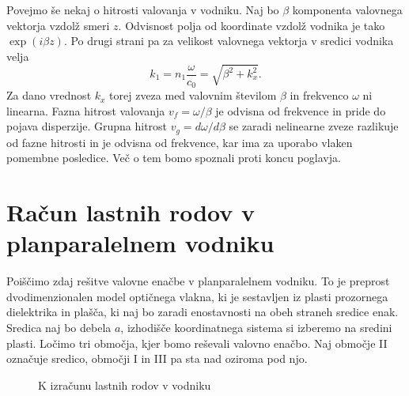 Povejmo še nekaj o hitrosti valovanja v vodniku.
Naj bo $\beta$ komponenta valovnega vektorja vzdolž smeri $z$. Odvisnost polja
od koordinate vzdolž vodnika je tako $\exp (i\beta z)$. Po drugi strani pa za velikost
valovnega vektorja v sredici vodnika velja
\begin{equation}
k_1 = n_{1}\frac{\omega}{c_0}=\sqrt{\beta^{2}+k_{x}^{2}}
\label{9.0}.
\end{equation}
Za dano vrednost $k_{x}$ torej zveza med valovnim številom $\beta$
in frekvenco $\omega$ ni linearna. Fazna hitrost valovanja $v_{f}=\omega/\beta$ je
odvisna od frekvence in pride do pojava disperzije. Grupna hitrost $v_{g}=d\omega/d\beta$ 
se zaradi nelinearne zveze razlikuje od fazne hitrosti in je odvisna od 
frekvence, kar ima za uporabo vlaken pomembne posledice. Več o tem bomo spoznali 
proti koncu poglavja. 

\section{Račun lastnih rodov v planparalelnem vodniku}
Poiščimo zdaj rešitve valovne enačbe v planparalelnem vodniku. 
To je preprost dvodimenzionalen model optičnega vlakna, ki je sestavljen iz 
plasti prozornega dielektrika in plašča, ki naj bo zaradi enostavnosti na obeh 
straneh sredice enak. Sredica naj bo debela $a$, izhodišče koordinatnega sistema
si izberemo na sredini plasti. Ločimo tri območja, kjer bomo reševali valovno enačbo.
Naj območje II označuje sredico, območji I in III pa sta nad oziroma pod njo. 

\begin{figure}[h]
\centering
\def\svgwidth{120truemm} 

\caption{K izračunu lastnih rodov v vodniku}
\label{fig:vodnikracun}
\end{figure}

